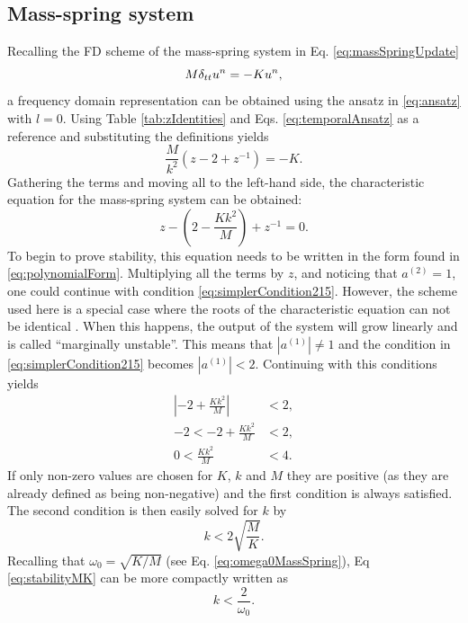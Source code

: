 {{\subsection{Mass-spring system}\label{sec:massSpringStability}
Recalling the FD scheme of the mass-spring system in Eq. \eqref{eq:massSpringUpdate}
\begin{equation*}
    M \delta_{tt} u^n = -K u^n,
\end{equation*} 
a frequency domain representation can be obtained using the ansatz in \eqref{eq:ansatz} with $l = 0$. Using Table \ref{tab:zIdentities} and Eqs. \eqref{eq:temporalAnsatz} as a reference and substituting the definitions yields
\begin{equation*}
    \frac{M}{k^2}\left(z -2 +z^{-1}\right) = -K.
\end{equation*}
Gathering the terms and moving all to the left-hand side, the characteristic equation for the mass-spring system can be obtained:
\begin{equation}\label{eq:massSpringCharacteristic}
    z - \left(2-\frac{Kk^2}{M} \right) + z^{-1} = 0. 
\end{equation}
To begin to prove stability, this equation needs to be written in the form found in \eqref{eq:polynomialForm}. Multiplying all the terms by $z$, and noticing that $a^{(2)} = 1$, one could continue with condition \eqref{eq:simplerCondition215}. However, the scheme used here is a special case where the roots of the characteristic equation can not be identical \cite{theBible}. When this happens, the output of the system will grow linearly and is called ``marginally unstable''. This means that $|a^{(1)}|\neq 1$ and the condition in \eqref{eq:simplerCondition215} becomes $|a^{(1)}|<2$. Continuing with this conditions yields
\begin{align*}
    \left|-2+\frac{Kk^2}{M}\right| &< 2,\\
    -2 < -2+\frac{Kk^2}{M} &< 2,\\
    0 < \frac{Kk^2}{M} &< 4.
\end{align*}
If only non-zero values are chosen for $K$, $k$ and $M$ they are positive (as they are already defined as being non-negative) and the first condition is always satisfied. The second condition is then easily solved for $k$ by
\begin{equation}\label{eq:stabilityMK}
    k < 2\sqrt{\frac{M}{K}}.
\end{equation}
Recalling that $\omega_0 = \sqrt{K/M}$ (see Eq. \eqref{eq:omega0MassSpring}), Eq \eqref{eq:stabilityMK} can be more compactly written as 
\begin{equation}
    k <\frac{2}{\omega_0}.
\end{equation}

}}
